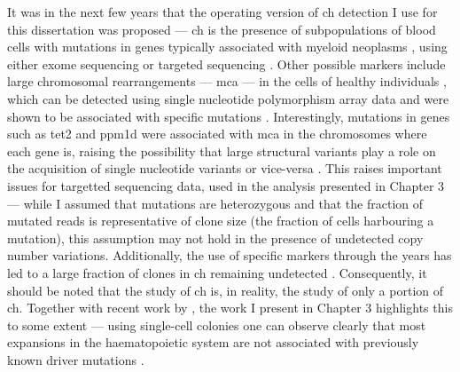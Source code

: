 It was in the next few years that the operating version of \ac{ch} detection I use for this dissertation was proposed --- \ac{ch} is the presence of subpopulations of blood cells with mutations in genes typically associated with myeloid neoplasms \cite{Jaiswal2014-rl,Genovese2014-eu,Xie2014-np,McKerrell2015-rl}, using either exome sequencing \cite{Xie2014-np,Jaiswal2014-rl,Genovese2014-eu} or targeted sequencing \cite{McKerrell2015-rl}. Other possible markers include large chromosomal rearrangements --- \ac{mca} --- in the cells of healthy individuals \cite{Jacobs2012-cj,Laurie2012-fc,Loh2018-xp,Gao2021-ph}, which can be detected using single nucleotide polymorphism array data and were shown to be associated with specific mutations \cite{Loh2018-xp,Gao2021-ph}. Interestingly, mutations in genes such as \ac{tet2} and \ac{ppm1d} were associated with \ac{mca} in the chromosomes where each gene is, raising the possibility that large structural variants play a role on the acquisition of single nucleotide variants or vice-versa \cite{Gao2021-ph}. This raises important issues for targetted sequencing data, used in the analysis presented in Chapter 3 --- while I assumed that mutations are heterozygous and that the fraction of mutated reads is representative of clone size (the fraction of cells harbouring a mutation), this assumption may not hold in the presence of undetected copy number variations. Additionally, the use of specific markers through the years has led to a large fraction of clones in \ac{ch} remaining undetected \cite{Poon2020-hl,Genovese2014-eu,Zink2017-zi}. Consequently, it should be noted that the study of \ac{ch} is, in reality, the study of only a portion of \ac{ch}. Together with recent work by , the work I present in Chapter 3 highlights this to some extent --- using single-cell colonies one can observe clearly that most expansions in the haematopoietic system are not associated with previously known driver mutations \cite{Fabre2021-uw,Mitchell2021-zl}. 

